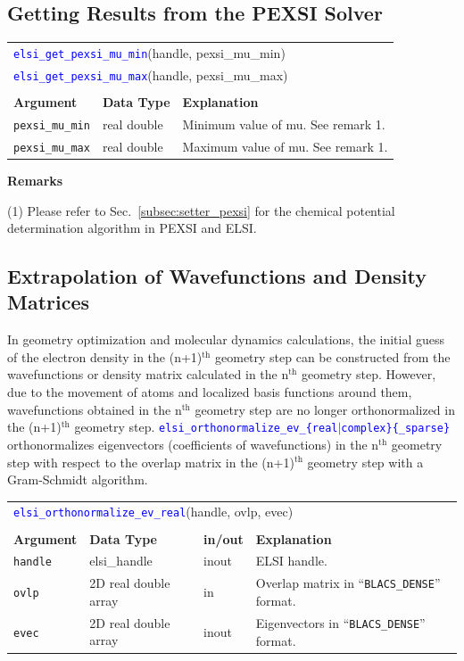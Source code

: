 \documentclass{report}
\newcommand{\api}[1]{\textcolor{blue}{\texttt{#1}}}
\begin{document}
\subsection{Getting Results from the PEXSI Solver}
\label{subsec:getter_pexsi}
\begin{tabular}[]{|p{30mm}|p{20mm}|p{112mm}|}
\multicolumn{3}{l}{\api{elsi\_get\_pexsi\_mu\_min}(handle, pexsi\_mu\_min)}\\
\multicolumn{3}{l}{\api{elsi\_get\_pexsi\_mu\_max}(handle, pexsi\_mu\_max)}\\
\multicolumn{3}{l}{}\\
\hline
\multicolumn{1}{|l|}{\textbf{Argument}} & \multicolumn{1}{l|}{\textbf{Data Type}} & \multicolumn{1}{l|}{\textbf{Explanation}}\\
\hline
\texttt{pexsi\_mu\_min} & real double & Minimum value of mu. See remark 1.\\
\hline
\texttt{pexsi\_mu\_max} & real double & Maximum value of mu. See remark 1.\\
\hline
\end{tabular}

\textbf{Remarks}

(1) Please refer to Sec.~\ref{subsec:setter_pexsi} for the chemical potential determination algorithm in PEXSI and ELSI.

\subsection{Extrapolation of Wavefunctions and Density Matrices}
\label{subsec:extrapolation}
In geometry optimization and molecular dynamics calculations, the initial guess of the electron density in the (n+1)$^\text{th}$ geometry step can be constructed from the wavefunctions or density matrix calculated in the n$^\text{th}$ geometry step. However, due to the movement of atoms and localized basis functions around them, wavefunctions obtained in the n$^\text{th}$ geometry step are no longer orthonormalized in the (n+1)$^\text{th}$ geometry step. \api{elsi\_orthonormalize\_ev\_\{real$\vert$complex\}\{\_sparse\}} orthonormalizes eigenvectors (coefficients of wavefunctions) in the n$^\text{th}$ geometry step with respect to the overlap matrix in the (n+1)$^\text{th}$ geometry step with a Gram-Schmidt algorithm.

\begin{tabular}[]{|p{20mm}|p{40mm}|p{10mm}|p{92mm}|}
\multicolumn{4}{l}{\api{elsi\_orthonormalize\_ev\_real}(handle, ovlp, evec)}\\
\multicolumn{4}{l}{}\\
\hline
\multicolumn{1}{|l|}{\textbf{Argument}} & \multicolumn{1}{l|}{\textbf{Data Type}} & \multicolumn{1}{l|}{\textbf{in/out}} & \multicolumn{1}{l|}{\textbf{Explanation}}\\
\hline
\texttt{handle} & elsi\_handle         & inout & ELSI handle.\\
\hline
\texttt{ovlp}   & 2D real double array & in    & Overlap matrix in ``\texttt{BLACS\_DENSE}'' format.\\
\hline
\texttt{evec}   & 2D real double array & inout & Eigenvectors in ``\texttt{BLACS\_DENSE}'' format.\\
\hline
\end{tabular}
\end{document}
